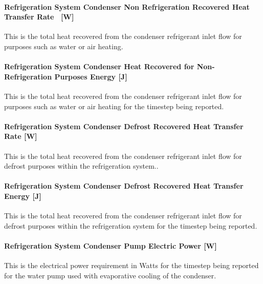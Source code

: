 \paragraph{Refrigeration System Condenser Non Refrigeration Recovered Heat Transfer Rate~ {[}W{]}}\label{refrigeration-system-condenser-non-refrigeration-recovered-heat-transfer-rate-w-1}

This is the total heat recovered from the condenser refrigerant inlet flow for purposes such as water or air heating.

\paragraph{Refrigeration System Condenser Heat Recovered for Non-Refrigeration Purposes Energy {[}J{]}}\label{refrigeration-system-condenser-heat-recovered-for-non-refrigeration-purposes-energy-j}

This is the total heat recovered from the condenser refrigerant inlet flow for purposes such as water or air heating for the timestep being reported.

\paragraph{Refrigeration System Condenser Defrost Recovered Heat Transfer Rate {[}W{]}}\label{refrigeration-system-condenser-defrost-recovered-heat-transfer-rate-w-1}

This is the total heat recovered from the condenser refrigerant inlet flow for defrost purposes within the refrigeration system..

\paragraph{Refrigeration System Condenser Defrost Recovered Heat Transfer Energy {[}J{]}}\label{refrigeration-system-condenser-defrost-recovered-heat-transfer-energy-j-1}

This is the total heat recovered from the condenser refrigerant inlet flow for defrost purposes within the refrigeration system for the timestep being reported.

\paragraph{Refrigeration System Condenser Pump Electric Power {[}W{]}}\label{refrigeration-system-condenser-pump-electric-power-w}

This is the electrical power requirement in Watts for the timestep being reported for the water pump used with evaporative cooling of the condenser.

